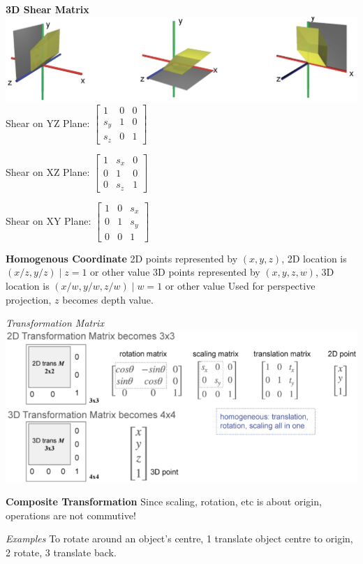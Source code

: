 \documentclass[letterpaper, 8pt]{extarticle}
\begin{document}
\begin{multicols*}{4}
\textbf{3D Shear Matrix}
\includegraphics[width=\linewidth]{3d-shear.png}
Shear on YZ Plane:
\(
\begin{bmatrix}
    1   & 0 & 0 \\
    s_y & 1 & 0 \\
    s_z & 0 & 1
\end{bmatrix}
\)

Shear on XZ Plane:
\(
\begin{bmatrix}
    1 & s_x & 0 \\
    0 & 1   & 0 \\
    0 & s_z & 1
\end{bmatrix}
\)

Shear on XY Plane:
\(
\begin{bmatrix}
    1 & 0 & s_x \\
    0 & 1 & s_y \\
    0 & 0 & 1
\end{bmatrix}
\)

\textbf{Homogenous Coordinate}
2D points represented by \((x, y, z)\), 2D location is \((x/z, y/z) \mid z=1\) or other value
3D points represented by \((x, y, z, w)\), 3D location is \((x/w, y/w, z/w) \mid w=1\) or other value
Used for perspective projection, \(z\) becomes depth value.

\textit{Transformation Matrix}
\includegraphics[width=\linewidth]{homogenous-coord-transformation-matrix.png}

\textbf{Composite Transformation}
Since scaling, rotation, etc is about origin, operations are not commutive!

\textit{Examples}
To rotate around an object's centre, 1 translate object centre to origin, 2 rotate, 3 translate back.


\end{multicols*}
\end{document}
